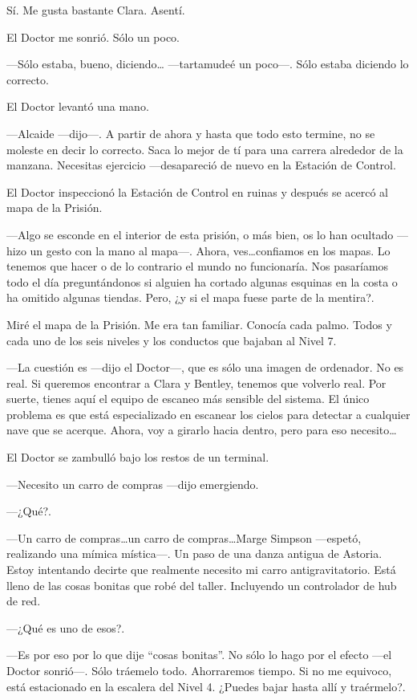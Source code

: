 Sí. Me gusta bastante Clara. Asentí.

El Doctor me sonrió. Sólo un poco.

---Sólo estaba, bueno, diciendo\ldots{} ---tartamudeé un poco---. Sólo
estaba diciendo lo correcto.

El Doctor levantó una mano.

---Alcaide ---dijo---. A partir de ahora y hasta que todo esto termine,
no se moleste en decir lo correcto. Saca lo mejor de tí para una carrera
alrededor de la manzana. Necesitas ejercicio ---desapareció de nuevo en
la Estación de Control.

El Doctor inspeccionó la Estación de Control en ruinas y después se
acercó al mapa de la Prisión.

---Algo se esconde en el interior de esta prisión, o más bien, os lo han
ocultado ---hizo un gesto con la mano al mapa---. Ahora,
ves\ldots{}confiamos en los mapas. Lo tenemos que hacer o de lo
contrario el mundo no funcionaría. Nos pasaríamos todo el día
preguntándonos si alguien ha cortado algunas esquinas en la costa o ha
omitido algunas tiendas. Pero, ¿y si el mapa fuese parte de la mentira?.

Miré el mapa de la Prisión. Me era tan familiar. Conocía cada palmo.
Todos y cada uno de los seis niveles y los conductos que bajaban al
Nivel 7.

---La cuestión es ---dijo el Doctor---, que es sólo una imagen de
ordenador. No es real. Si queremos encontrar a Clara y Bentley, tenemos
que volverlo real. Por suerte, tienes aquí el equipo de escaneo más
sensible del sistema. El único problema es que está especializado en
escanear los cielos para detectar a cualquier nave que se acerque.
Ahora, voy a girarlo hacia dentro, pero para eso necesito\ldots{}

El Doctor se zambulló bajo los restos de un terminal.

---Necesito un carro de compras ---dijo emergiendo.

---¿Qué?.

---Un carro de compras\ldots{}un carro de compras\ldots{}Marge Simpson
---espetó, realizando una mímica mística---. Un paso de una danza
antigua de Astoria. Estoy intentando decirte que realmente necesito mi
carro antigravitatorio. Está lleno de las cosas bonitas que robé del
taller. Incluyendo un controlador de hub de red.

---¿Qué es uno de esos?.

---Es por eso por lo que dije ``cosas bonitas''. No sólo lo hago por el
efecto ---el Doctor sonrió---. Sólo tráemelo todo. Ahorraremos tiempo.
Si no me equivoco, está estacionado en la escalera del Nivel 4. ¿Puedes
bajar hasta allí y traérmelo?.

